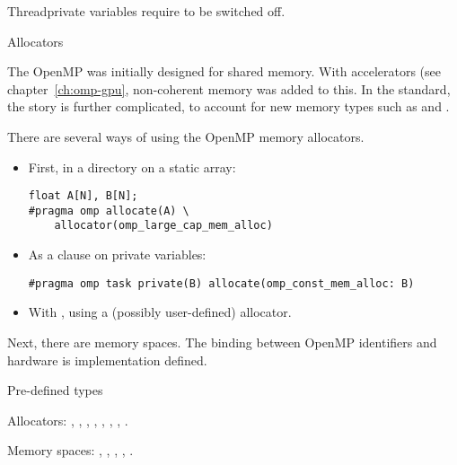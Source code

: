 Threadprivate variables require  to be
switched off.

 {Allocators}

The OpenMP was initially designed for shared memory.
With accelerators (see chapter~\ref{ch:omp-gpu}, non-coherent memory was added to this.
In the  standard, the story is further complicated, to account
for new memory types such as 
and .

There are several ways of using the OpenMP memory allocators.
\begin{itemize}
\item
  First, in a directory on a static array:
\begin{lstlisting}
float A[N], B[N];
#pragma omp allocate(A) \
    allocator(omp_large_cap_mem_alloc)
\end{lstlisting}
\item As a clause on private variables:
\begin{lstlisting}
#pragma omp task private(B) allocate(omp_const_mem_alloc: B)
\end{lstlisting}
\item
  With , using a (possibly user-defined) allocator.
\end{itemize}

Next, there are memory spaces. The binding between OpenMP identifiers and hardware
is implementation defined.

 {Pre-defined types}

Allocators:
,
,
,
,
,
,
,
.

Memory spaces:
,
,
,
,
.
